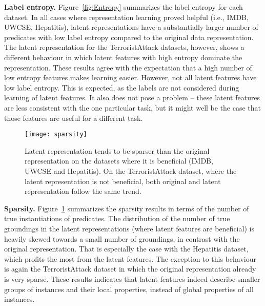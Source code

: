 \textbf{Label entropy.}
Figure~\ref{fig:Entropy} summarizes the label entropy for each dataset.
In all cases where representation learning proved helpful (i.e., IMDB, UWCSE, Hepatitis), latent representations have a substantially larger number of predicates with low label entropy compared to the original data representation. 
The latent representation for the TerroristAttack datasets, however, shows a different behaviour in which latent features with high entropy dominate the representation.
These results agree with the expectation that a high number of low entropy features makes learning easier.
However, not all latent features have low label entropy.
This is expected, as the labels are not considered during learning of latent features.
It also does not pose a problem -- these latent features are less consistent with the one particular task, but it might well be the case that those features are useful for a different task.




\begin{figure}
	\centering
	\medskip
    \texttt{[image: sparsity]}
    \caption{Latent representation tends to be sparser than the original representation on the datasets where it is beneficial (IMDB, UWCSE and Hepatitis). On the TerroristAttack dataset, where the latent representation is not beneficial, both original and latent representation follow the same trend. }
    \label{fig:Sparsity}
\end{figure}


\textbf{Sparsity.}
Figure~\ref{fig:Sparsity} summarizes the sparsity results in terms of the number of true instantiations of predicates.
The distribution of the number of true groundings in the latent representations (where latent features are beneficial) is heavily skewed towards a small number of groundings, in contrast with the original representation.
That is especially the case with the Hepatitis dataset, which profits the most from the latent features.
The exception to this behaviour is again the TerroristAttack dataset in which the original representation already is very sparse.
These results indicates that latent features indeed describe smaller groups of instances and their local properties, instead of global properties of all instances. 





